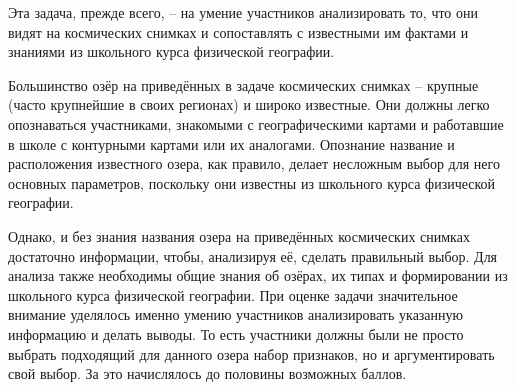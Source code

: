 \explanationSection

Эта задача, прежде всего, – на умение участников анализировать то, что они видят на космических снимках и сопоставлять с известными им фактами и знаниями из школьного курса физической географии.

Большинство озёр на приведённых в задаче космических снимках – крупные (часто крупнейшие в своих регионах) и широко известные. Они должны легко опознаваться участниками, знакомыми с географическими картами и работавшие в школе с контурными картами или их аналогами. Опознание название и расположения известного озера, как правило, делает несложным выбор для него основных параметров, поскольку они известны из школьного курса физической географии.

Однако, и без знания названия озера на приведённых космических снимках достаточно информации, чтобы, анализируя её, сделать правильный выбор. Для анализа также необходимы общие знания об озёрах, их типах и формировании из школьного курса физической географии. При оценке задачи значительное внимание уделялось именно умению участников анализировать указанную информацию и делать выводы. То есть участники должны были не просто выбрать подходящий для данного озера набор признаков, но и аргументировать свой выбор. За это начислялось до половины возможных баллов.

